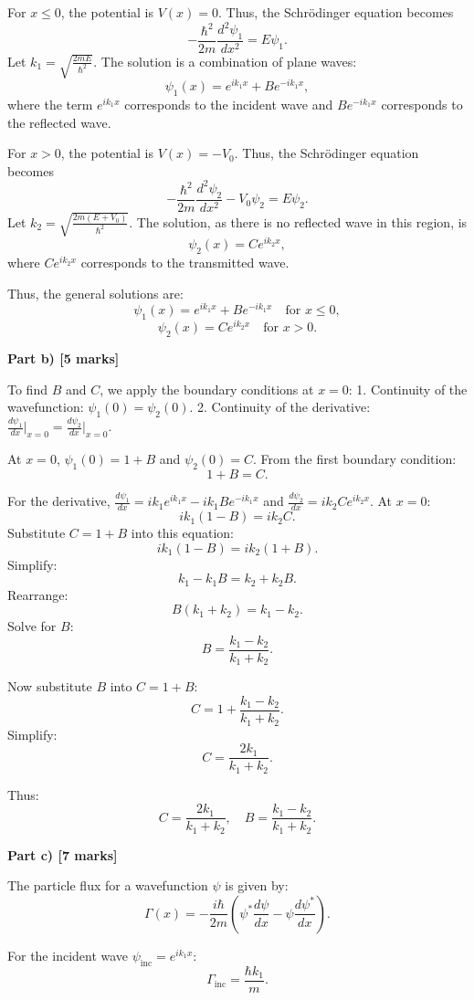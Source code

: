 \documentclass{article}
\begin{document}
For $x \leq 0$, the potential is $V(x) = 0$. Thus, the Schrödinger equation becomes
\[
-\frac{\hbar^2}{2m} \frac{d^2 \psi_1}{dx^2} = E \psi_1.
\]
Let $k_1 = \sqrt{\frac{2mE}{\hbar^2}}$. The solution is a combination of plane waves:
\[
\psi_1(x) = e^{ik_1x} + B e^{-ik_1x},
\]
where the term $e^{ik_1x}$ corresponds to the incident wave and $Be^{-ik_1x}$ corresponds to the reflected wave.

For $x > 0$, the potential is $V(x) = -V_0$. Thus, the Schrödinger equation becomes
\[
-\frac{\hbar^2}{2m} \frac{d^2 \psi_2}{dx^2} - V_0 \psi_2 = E \psi_2.
\]
Let $k_2 = \sqrt{\frac{2m(E+V_0)}{\hbar^2}}$. The solution, as there is no reflected wave in this region, is
\[
\psi_2(x) = C e^{ik_2x},
\]
where $Ce^{ik_2x}$ corresponds to the transmitted wave.

Thus, the general solutions are:
\[
\psi_1(x) = e^{ik_1x} + Be^{-ik_1x} \quad \text{for } x \leq 0,
\]
\[
\psi_2(x) = Ce^{ik_2x} \quad \text{for } x > 0.
\]

\textbf{Part b) [5 marks]} 

To find $B$ and $C$, we apply the boundary conditions at $x = 0$:
1. Continuity of the wavefunction: $\psi_1(0) = \psi_2(0)$.
2. Continuity of the derivative: $\frac{d\psi_1}{dx}\big|_{x=0} = \frac{d\psi_2}{dx}\big|_{x=0}$.

At $x = 0$, $\psi_1(0) = 1 + B$ and $\psi_2(0) = C$. From the first boundary condition:
\[
1 + B = C.
\]

For the derivative, $\frac{d\psi_1}{dx} = ik_1 e^{ik_1x} - ik_1 Be^{-ik_1x}$ and $\frac{d\psi_2}{dx} = ik_2 Ce^{ik_2x}$. At $x = 0$:
\[
ik_1 (1 - B) = ik_2 C.
\]
Substitute $C = 1 + B$ into this equation:
\[
ik_1 (1 - B) = ik_2 (1 + B).
\]
Simplify:
\[
k_1 - k_1B = k_2 + k_2B.
\]
Rearrange:
\[
B(k_1 + k_2) = k_1 - k_2.
\]
Solve for $B$:
\[
B = \frac{k_1 - k_2}{k_1 + k_2}.
\]

Now substitute $B$ into $C = 1 + B$:
\[
C = 1 + \frac{k_1 - k_2}{k_1 + k_2}.
\]
Simplify:
\[
C = \frac{2k_1}{k_1 + k_2}.
\]

Thus:
\[
C = \frac{2k_1}{k_1 + k_2}, \quad B = \frac{k_1 - k_2}{k_1 + k_2}.
\]

\textbf{Part c) [7 marks]} 

The particle flux for a wavefunction $\psi$ is given by:
\[
\Gamma(x) = -\frac{i\hbar}{2m} \left( \psi^* \frac{d\psi}{dx} - \psi \frac{d\psi^*}{dx} \right).
\]

For the incident wave $\psi_\text{inc} = e^{ik_1x}$:
\[
\Gamma_\text{inc} = \frac{\hbar k_1}{m}.
\]
\end{document}
